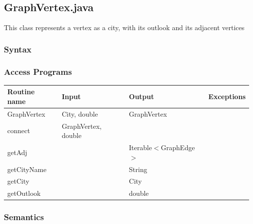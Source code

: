 \documentclass[12pt,fleqn]{article}
\begin{document}
\subsection*{GraphVertex.java}\label{vertex}
This class represents a vertex as a city, with its outlook and its adjacent vertices
\subsubsection* {Syntax}

\subsubsection* {Access Programs}
\begin{tabular}{| l | l | l | l |}
\hline
\textbf{Routine name} & \textbf{Input} & \textbf{Output} & \textbf{Exceptions}\\
\hline
GraphVertex & City, double & GraphVertex & ~\\
\hline
connect & GraphVertex, double & ~ & ~\\
\hline
getAdj & ~ & Iterable$<$GraphEdge$>$ & ~\\
\hline
getCityName & ~ & String & ~\\
\hline
getCity & ~ & City & ~\\
\hline
getOutlook & ~ & double & ~\\
\hline
\end{tabular}

\subsubsection*{Semantics}
\end{document}
